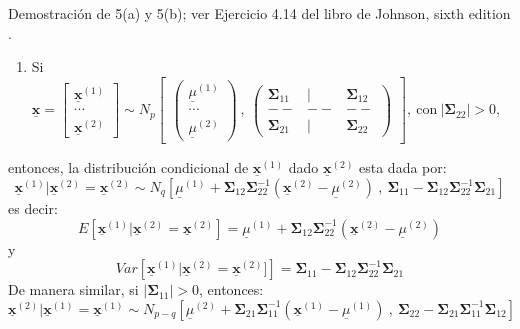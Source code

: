 \documentclass[
]{book}
\providecommand{\tightlist}{%
  \setlength{\itemsep}{0pt}\setlength{\parskip}{0pt}}
\theoremstyle{definition}
\theoremstyle{definition}
\theoremstyle{definition}
\theoremstyle{definition}
\theoremstyle{remark}
\begin{document}
Demostración de 5(a) y 5(b); ver Ejercicio 4.14 del libro de Johnson, sixth edition \citep{johnson2007applied}.

\begin{enumerate}
\def\labelenumi{\arabic{enumi}.}
\setcounter{enumi}{5}
\tightlist
\item
  Si
  \(\underline{\mathbf{x}}=\begin{bmatrix} \underline{\mathbf{x}}^{(1)} \\ \cdots \\ \underline{\mathbf{x}}^{(2)} \end{bmatrix} \sim N_{p} \begin{bmatrix} \begin{pmatrix} \underline{\mu}^{(1)} \\ \cdots \\ \underline{\mu}^{(2)} \end{pmatrix} \ , \ \begin{pmatrix} \mathbf{\Sigma}_{11} & | & \mathbf{\Sigma}_{12} \\ -- & -- & -- \\ \mathbf{\Sigma}_{21} & | & \mathbf{\Sigma}_{22} \end{pmatrix} \end{bmatrix},\  \text{con} \  |\mathbf{\Sigma}_{22}|>0\),
\end{enumerate}

entonces, la distribución condicional de \(\underline{\mathbf{x}}^{(1)}\)
dado \(\underline{\mathbf{x}}^{(2)}\) esta dada por:
\begin{equation}
\underline{\mathbf{x}}^{(1)}|\underline{\mathbf{x}}^{(2)}=\underline{\mathbf{x}}^{(2)} \sim N_q \left[ 
\underline{\mu}^{(1)}+\mathbf{\Sigma}_{12}\mathbf{\Sigma}_{22}^{-1}\left(\underline{\mathbf{x}}^{(2)}-
\underline{\mu}^{(2)}\right)  \ , \   \mathbf{\Sigma}_{11}-\mathbf{\Sigma}_{12}\mathbf{\Sigma}_{22}^{-1}\mathbf{\Sigma}_{21}  \right]
\label{eq:prop-6a}
\end{equation}
es decir:
\[
E\left[\underline{\mathbf{x}}^{(1)}|\underline{\mathbf{x}}^{(2)}=\underline{\mathbf{x}}^{(2)}\right]=\underline{\mu}^{(1)}+
\mathbf{\Sigma}_{12}\mathbf{\Sigma}_{22}^{-1}\left(\underline{\mathbf{x}}^{(2)}-
\underline{\mu}^{(2)}\right)
\]
y
\[
Var\left[\underline{\mathbf{x}}^{(1)}|\underline{\mathbf{x}}^{(2)}=\underline{\mathbf{x}}^{(2)}]\right]=
\mathbf{\Sigma}_{11}-\mathbf{\Sigma}_{12}\mathbf{\Sigma}_{22}^{-1}\mathbf{\Sigma}_{21}
\]
De manera similar, si \(|\mathbf{\Sigma}_{11}|>0\), entonces:
\begin{equation}
\underline{\mathbf{x}}^{(2)}|\underline{\mathbf{x}}^{(1)}=\underline{\mathbf{x}}^{(1)} \sim N_{p-q} \left[ \underline{\mu}^{(2)}+\mathbf{\Sigma}_{21}\mathbf{\Sigma}_{11}^{-1}\left(\underline{\mathbf{x}}^{(1)}-
\underline{\mu}^{(1)}\right) \ , \   \mathbf{\Sigma}_{22}-\mathbf{\Sigma}_{21}\mathbf{\Sigma}_{11}^{-1}\mathbf{\Sigma}_{12}  \right]
\label{eq:prop-6b}
\end{equation}
\end{document}
